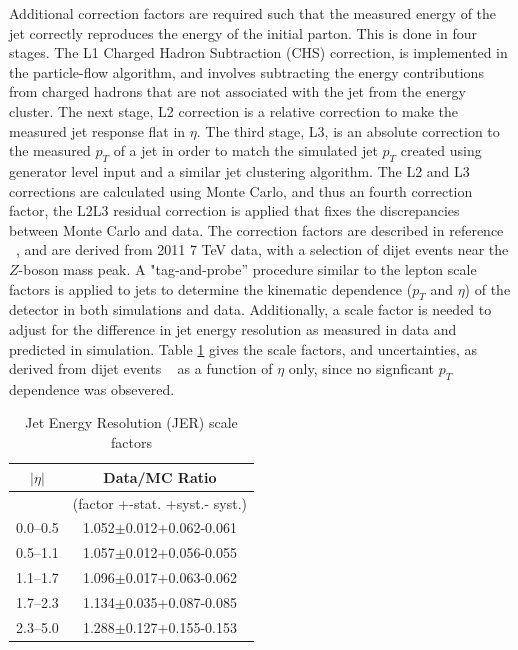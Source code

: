 \par Additional correction factors are required such that the measured
energy of the jet correctly reproduces the energy of the initial
parton.  This is done in four stages.  The L1 Charged Hadron
Subtraction (CHS) correction, is implemented in the particle-flow
algorithm, and involves subtracting the energy contributions from
charged hadrons that are not associated with the jet from the energy
cluster.  The next stage, L2 correction is a relative correction to
make the measured jet response flat in $\eta$.  The third stage, L3,
is an absolute correction to the measured $p_T$ of a jet in order to
match the simulated jet $p_{T}$ created using generator level input
and a similar jet clustering algorithm. The L2 and L3 corrections are
calculated using Monte Carlo, and thus an fourth correction factor,
the L2L3 residual correction is applied that fixes the discrepancies
between Monte Carlo and data.  The correction factors are described in
reference ~\cite{CMS:2011esa}, and are derived from 2011 7 TeV data,
with a selection of dijet events near the $Z$-boson mass peak.  A
"tag-and-probe'' procedure similar to the lepton scale factors is
applied to jets to determine the kinematic dependence ($p_{T}$ and
$\eta$) of the detector in both simulations and data.  Additionally, a
scale factor is needed to adjust for the difference in jet energy
resolution as measured in data and predicted in simulation.  Table
\ref{tab:JERtable} gives the scale factors, and uncertainties, as
derived from dijet events ~\cite{CMS:2011esa} as a function of $\eta$
only, since no signficant $p_{T}$ dependence was obsevered.  

\begin{table}
\centering
\begin{tabular}{|c|c|}
\hline\hline
$|\eta|$ & Data/MC Ratio \\ \hline
 & (factor +-stat. +syst.- syst.) \\ \hline
0.0–0.5 & 1.052$\pm$0.012+0.062-0.061 \\
0.5–1.1 & 1.057$\pm$0.012+0.056-0.055 \\
1.1–1.7 & 1.096$\pm$0.017+0.063-0.062 \\
1.7–2.3 & 1.134$\pm$0.035+0.087-0.085 \\
2.3–5.0 & 1.288$\pm$0.127+0.155-0.153 \\
\hline\hline
\end{tabular}
\caption{Jet Energy Resolution (JER) scale factors}
\label{tab:JERtable}
\end{table} 

